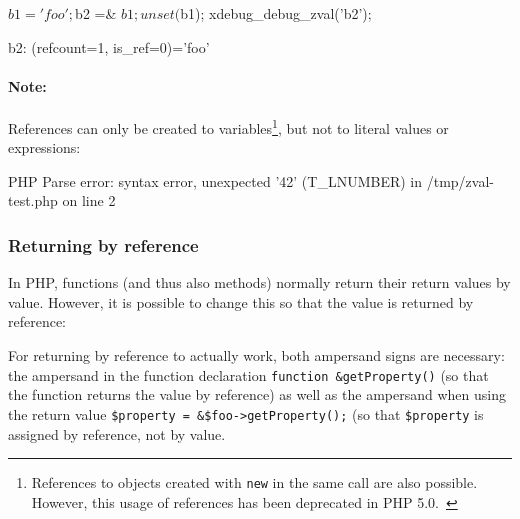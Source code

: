 \begin{phpcode}
$b1 = 'foo';
$b2 =& $b1;
unset($b1);
xdebug_debug_zval('b2');
\end{phpcode}

\begin{textcode}
b2: (refcount=1, is_ref=0)='foo'
\end{textcode}

\paragraph{Note:} References can only be created to variables\footnote{References to objects created with \texttt{new} in the same call are also possible. However, this usage of references has been deprecated in PHP 5.0.~\cite{php-manual-what-references-do}}, but not to literal values or expressions:


\begin{textcode}
PHP Parse error:  syntax error, unexpected '42' (T_LNUMBER) in
  /tmp/zval-test.php on line 2
\end{textcode}


\subsubsection{Returning by reference}

In PHP, functions (and thus also methods) normally return their return values by value. However, it is possible to change this so that the value is returned by reference:~\cite{php-manual-returning-reference}



For returning by reference to actually work, both ampersand signs are necessary: the ampersand in the function declaration \texttt{function \&getProperty()} (so that the function returns the value by reference) as well as the ampersand when using the return value \texttt{\$property = \&\$foo->getProperty();} (so that \texttt{\$property} is assigned by reference, not by value.


